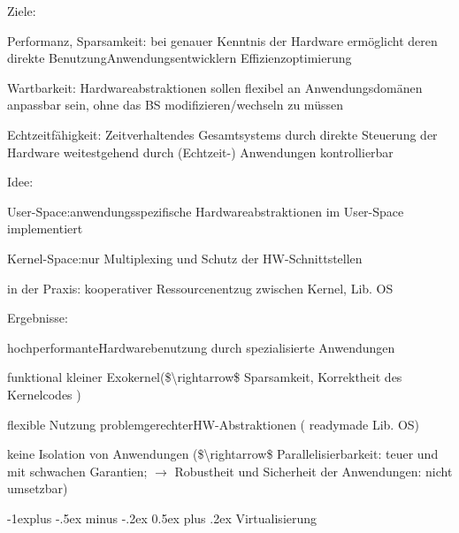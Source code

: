 \documentclass[a4paper]{article}
\makeatletter
\renewcommand{\subsection}{\@startsection{subsection}{2}{0mm}%
 {-1explus -.5ex minus -.2ex}%
 {0.5ex plus .2ex}%
 {\normalfont\normalsize\bfseries}}
\makeatother
\begin{document}
\begin{multicols}{3}
    \begin{itemize*}
        \item
        Ziele:
        \begin{itemize*}
            \item Performanz, Sparsamkeit: bei genauer Kenntnis der Hardware ermöglicht deren direkte BenutzungAnwendungsentwicklern Effizienzoptimierung
            \item Wartbarkeit: Hardwareabstraktionen sollen flexibel an Anwendungsdomänen anpassbar sein, ohne das BS modifizieren/wechseln zu müssen
            \item Echtzeitfähigkeit: Zeitverhaltendes Gesamtsystems durch direkte Steuerung der Hardware weitestgehend durch (Echtzeit-) Anwendungen kontrollierbar
        \end{itemize*}
        \item
        Idee:
        \begin{itemize*}
            \item User-Space:anwendungsspezifische Hardwareabstraktionen im User-Space implementiert
            \item Kernel-Space:nur Multiplexing und Schutz der HW-Schnittstellen
            \item in der Praxis: kooperativer Ressourcenentzug zwischen Kernel, Lib. OS
        \end{itemize*}
        \item
        Ergebnisse:
        \begin{itemize*}
            \item hochperformanteHardwarebenutzung durch spezialisierte Anwendungen
            \item funktional kleiner Exokernel(\$\textbackslash rightarrow\$ Sparsamkeit, Korrektheit des Kernelcodes )
            \item flexible Nutzung problemgerechterHW-Abstraktionen ( readymade Lib. OS)
            \item keine Isolation von Anwendungen (\$\textbackslash rightarrow\$ Parallelisierbarkeit: teuer und mit schwachen Garantien; $\rightarrow$  Robustheit und Sicherheit der Anwendungen: nicht umsetzbar)
        \end{itemize*}
    \end{itemize*}


    \subsection{Virtualisierung}


\end{multicols}
\end{document}

